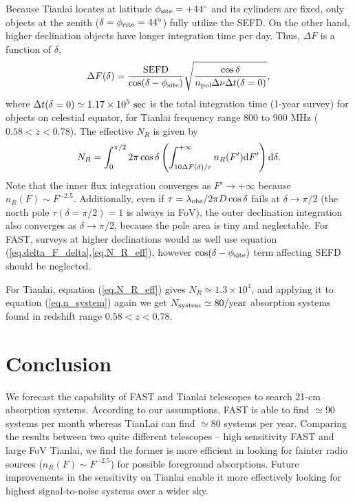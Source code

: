 \documentclass[]{raa}
\newcommand{\diff}{{\rm d}}
\begin{document}
Because Tianlai locates at latitude
$\phi_{\rm site}=+44^\circ$ and its cylinders are fixed, only
objects at the zenith ($\delta=\phi_{\rm cite}=44^\circ$) fully utilize
the SEFD. On the other hand, higher declination objects
have longer integration time per day. Thus, $\Delta F$ is
a function of $\delta$, 
\begin{equation}\label{eq.delta_F_delta}
    \Delta F(\delta) = \frac{\rm SEFD}{\cos(\delta-\phi_{\rm site})}
    {\sqrt{\frac{\cos\delta}{n_{\rm pol}\Delta\nu\Delta t(\delta=0)}}},
\end{equation}
where $\Delta t(\delta=0)\simeq 1.17\times 10^5\ {\rm sec}$ is the
total integration time (1-year survey) for objects on celestial equator,
for Tianlai frequency range 800 to 900 MHz ($0.58<z<0.78$).
The effective $N_R$ is given by
\begin{equation}\label{eq.N_R_eff}
    N_R=\int_0^{\pi/2}2\pi\cos\delta
    \left(\int_{10\Delta F(\delta)/r}^{+\infty}
    n_R(F')\diff F'\right)
    \diff\delta.
\end{equation}
Note that the inner flux integration converges as
$F'\rightarrow+\infty$ because $n_R(F)\sim F^{-2.5}$.
Additionally, even if $\tau=\lambda_{\rm obs}/2\pi D\cos\delta$
fails at $\delta\rightarrow\pi/2$ (the north pole
$\tau(\delta=\pi/2)=1$ is always in FoV),
the outer declination integration also converges
as $\delta\rightarrow\pi/2$, because the pole area is
tiny and neglectable.
For FAST, surveys at higher declinations would as well
use equation (\ref{eq.delta_F_delta},\ref{eq.N_R_eff}),
however $\cos(\delta-\phi_{\rm site})$ term affecting
SEFD should be neglected.

For Tianlai, equation (\ref{eq.N_R_eff}) gives $N_R\simeq 1.3\times 10^4$,
and applying it to equation (\ref{eq.n_system}) again
we get $N_{\rm system}\simeq 80 {\rm /year}$ absorption
systems found in redshift range $0.58<z<0.78$.


\section{Conclusion}\label{sec.conclusion}
We forecast the capability of FAST and Tianlai telescopes to search 21-cm
absorption systems. According to our assumptions, FAST is able
to find $\simeq 90$ systems per month
whereas TianLai can find $\simeq 80$ systems per year.
Comparing the results between two quite different telescopes --
high sensitivity FAST and large FoV Tianlai, we find the former is
more efficient in looking for fainter radio sources
($n_R(F)\sim F^{-2.5}$) for possible foreground absorptions.
Future improvements in the sensitivity on Tianlai enable it
more effectively looking for highest signal-to-noise systems
over a wider sky.
\end{document}
